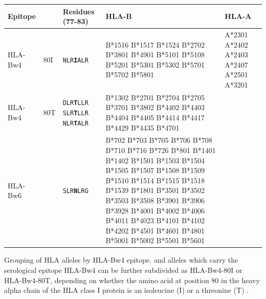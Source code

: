 

\clearpage

\begin{table} [h]
\begin{center}
\footnotesize
\begin{tabularx} {\linewidth} {l l X X X}
\toprule
Epitope & & Residues (77-83) & HLA-B & HLA-A \\
\midrule
HLA-Bw4 & 80I & {\tt{NLR{\bf{I}}ALR}} & B*1516 B*1517 B*1524 B*2702 B*3801 B*4901 B*5101 B*5108 B*5201 B*5301 B*5302 B*5701 B*5702 B*5801 & A*2301 A*2402 A*2403 A*2407 A*2501 A*3201 \\
\midrule
HLA-Bw4 & 80T &
\begin{minipage} [t]{1cm}
  {\tt{DLR{\bf{T}}LLR}} {\tt{SLR{\bf{T}}LLR}} {\tt{NLR{\bf{T}}ALR}}
\end{minipage} &
\begin{minipage} [t]{3cm}
B*1302 B*2701 B*2704 B*2705 B*3701 B*3802 B*4402 B*4403 B*4404 B*4405 B*4414 B*4417 B*4429 B*4435 B*4701
\end{minipage} & \\
\midrule
HLA-Bw6 &  & {\tt{SLR{\bf{N}}LRG}} & B*702 B*703 B*705 B*706 B*708 B*710 B*716 B*726 B*801 B*1401 B*1402 B*1501 B*1503 B*1504 B*1505 B*1507 B*1508 B*1509 B*1510 B*1514 B*1515 B*1518 B*1539 B*1801 B*3501 B*3502 B*3503 B*3508 B*3901 B*3906 B*3928 B*4001 B*4002 B*4006 B*4011 B*4023 B*4101 B*4102 B*4202 B*4501 B*4601 B*4801 B*5001 B*5002 B*5501 B*5601 & \\
\end{tabularx}
\end{center}
  {Grouping of HLA alleles by HLA-Bw4 epitope.}
  {
   and  alleles which carry the serological epitope HLA-Bw4 can be further subdivided as HLA-Bw4-80I or HLA-Bw4-80T,
  depending on whether the amino acid at position 80 in the heavy alpha chain of the HLA class I protein is an isoleucine (I) or a threonine (T)
  \citep{Gumperz:1997ve,Martin:2002el}.
  }
\end{table}



